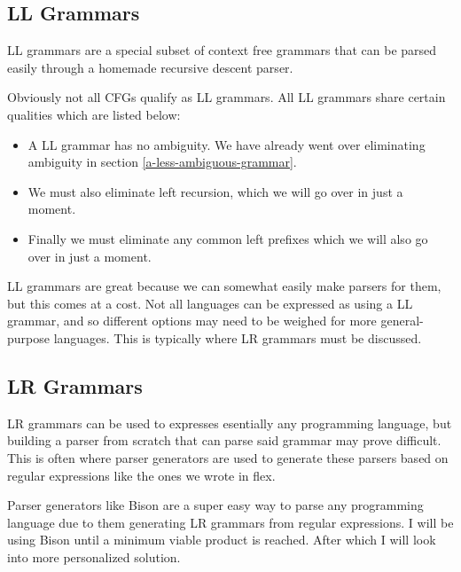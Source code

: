\documentclass{article}
\begin{document}
\subsection{LL Grammars}
LL grammars are a special subset of context free grammars that can be parsed easily through a homemade recursive descent parser.

Obviously not all CFGs qualify as LL grammars. All LL grammars share certain qualities which are listed below:
\begin{itemize}
    \item A LL grammar has no ambiguity. We have already went over eliminating ambiguity in section \ref{a-less-ambiguous-grammar}.
    \item We must also eliminate left recursion, which we will go over in just a moment.
    \item Finally we must eliminate any common left prefixes which we will also go over in just a moment.
\end{itemize}

LL grammars are great because we can somewhat easily make parsers for them, but this comes at a cost. Not all languages can be expressed as using a LL grammar, and so different options may need to be weighed for more general-purpose languages. This is typically where LR grammars must be discussed.
\subsection{LR Grammars}
LR grammars can be used to expresses esentially any programming language, but building a parser from scratch that can parse said grammar may prove difficult. This is often where parser generators are used to generate these parsers based on regular expressions like the ones we wrote in flex.

Parser generators like Bison are a super easy way to parse any programming language due to them generating LR grammars from regular expressions. I will be using Bison until a minimum viable product is reached. After which I will look into more personalized solution.
\end{document}
